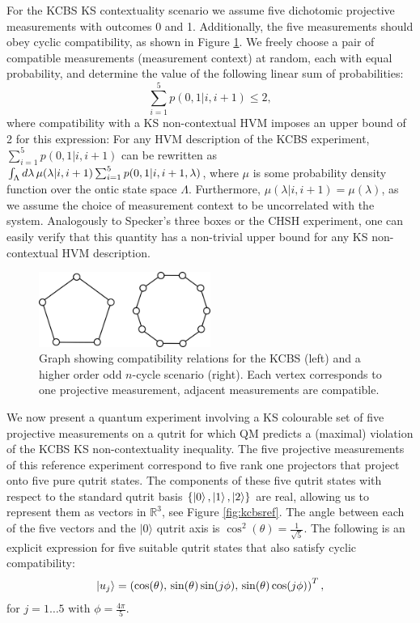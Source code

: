 For the KCBS KS contextuality scenario we assume five dichotomic projective measurements with outcomes 0 and 1. Additionally, the five measurements should obey cyclic compatibility, as shown in Figure \ref{fig:kcbscompat}. We freely choose a pair of compatible measurements (measurement context) at random, each with equal probability, and determine the value of the following linear sum of probabilities:
\begin{equation*}
    \sum_{i=1}^5 p(0,1\vert i, i+1)\leq 2,
\end{equation*}
where compatibility with a KS non-contextual HVM imposes an upper bound of 2 for this expression: For any HVM description of the KCBS experiment, $\sum_{i=1}^5 p(0,1\vert i,i+1)$ can be rewritten as $\int_{\Lambda}d\lambda\thinspace\mu(\lambda\vert i,i+1)\sum_{i=1}^5 p(0,1\vert i, i+1, \lambda)$, where $\mu$ is some probability density function over the ontic state space $\Lambda$. Furthermore, $\mu(\lambda\vert i,i+1)=\mu(\lambda)$, as we assume the choice of measurement context to be uncorrelated with the system. Analogously to Specker's three boxes or the CHSH experiment, one can easily verify that this quantity has a non-trivial upper bound for any KS non-contextual HVM description.

\begin{figure}
    \centering
    \includegraphics[width=0.5\textwidth]{images/kcbscompat.png}
    \caption{Graph showing compatibility relations for the KCBS (left) and a higher order odd $n$-cycle scenario (right). Each vertex corresponds to one projective measurement, adjacent measurements are compatible.}
    \label{fig:kcbscompat}
\end{figure}

We now present a quantum experiment involving a KS colourable set of five projective measurements on a qutrit for which QM predicts a (maximal) violation of the KCBS KS non-contextuality inequality. The five projective measurements of this reference experiment correspond to five rank one projectors that project onto five pure qutrit states. The components of these five qutrit states with respect to the standard qutrit basis $\{\ket{0}, \ket{1}, \ket{2}\}$ are real, allowing us to represent them as vectors in $\mathbb{R}^3$, see Figure \ref{fig:kcbsref}. The angle between each of the five vectors and the $\vert 0\rangle$ qutrit axis is $\cos^2(\theta)=\frac{1}{\sqrt{5}}$. The following is an explicit expression for five suitable qutrit states that also satisfy cyclic compatibility:
\begin{align*}
    \ket{u_j} = \left(\cos(\theta),\thinspace\sin(\theta)\sin(j\phi),\thinspace\sin(\theta)\cos(j\phi)\right)^T,
\end{align*}
for $\displaystyle j=1\dots 5$ with $\displaystyle\phi=\frac{4\pi}{5}$.

